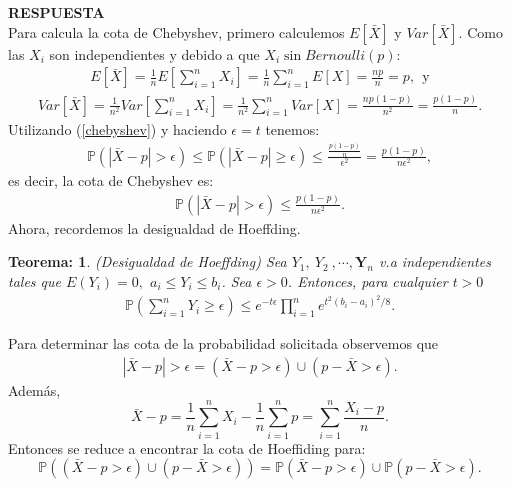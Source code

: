 \documentclass[11pt,letterpaper]{article}
\newcommand{\Y}{\mathbf{Y}}
\newcommand{\mP}{\mathbb{P}}
\newcommand{\res}{\textbf{RESPUESTA}\\}
\newtheorem{thm}{Teorema:}
\begin{document}
\res Para calcula la cota de Chebyshev, primero calculemos $E[\bar{X}]$ y $Var[\bar{X}]$. Como las $X_i$ son independientes y debido a que $X_i\sin Bernoulli(p)$:
\begin{align*}
E[\bar{X}]=\frac{1}{n}E[\sum_{i=1}^nX_i]=\frac{1}{n}\sum_{i=1}^nE[X]=\frac{np}{n}=p, \ \ \text{y}
\end{align*}
\begin{align*}
Var[\bar{X}]=\frac{1}{n^2}Var[\sum_{i=1}^nX_i]=\frac{1}{n^2}\sum_{i=1}^nVar[X]=\frac{np(1-p)}{n^2}=\frac{p(1-p)}{n}.
\end{align*}
Utilizando (\ref{chebyshev}) y haciendo $\epsilon=t$ tenemos:
\begin{align*}
\mP(|\bar{X}-p|>\epsilon) \leq \mP(|\bar{X}-p|\geq \epsilon) \leq \frac{\frac{p(1-p)}{n}}{\epsilon^2}=\frac{p(1-p)}{n\epsilon^2 },
\end{align*}
es decir, la cota de Chebyshev es:
\begin{align*}
\mP(|\bar{X}-p|>\epsilon) \leq \frac{p(1-p)}{n\epsilon^2 }.
\end{align*}
Ahora, recordemos la desigualdad de Hoeffding.
\begin{framed}
    \begin{thm} (Desigualdad de Hoeffding) Sea $Y_1, \ Y_2\ ,\cdots,\Y_n$ v.a independientes tales que $E(Y_i)=0,$ $a_i\leq Y_i \leq b_i$. Sea $\epsilon>0$. Entonces, para cualquier $t>0$
        \begin{align}
            \mP\left(\sum_{i=1}^nY_i\geq \epsilon \right) \leq e^{-t\epsilon}\prod_{i=1}^ne^{t^2(b_i-a_i)^2/8}.
        \end{align}
    \end{thm}
\end{framed} 
Para determinar las cota de la probabilidad solicitada observemos que
\begin{align}
\label{valor_absoluto}
|\bar{X}-p|>\epsilon=(\bar{X}-p>\epsilon)\cup(p-\bar{X}>\epsilon).
\end{align}
Además,
\begin{equation}
\label{igualdad}
\bar{X}-p=\frac{1}{n}\sum_{i=1}^n X_i-\frac{1}{n}\sum_{i=1}^n p=\sum_{i=1}^n\frac{X_i-p}{n}.
\end{equation}
Entonces se reduce a encontrar la cota de Hoeffiding para:
$$\mP\left( (\bar{X}-p>\epsilon)\cup(p-\bar{X}>\epsilon)\right)=\mP(\bar{X}-p>\epsilon)\cup\mP(p-\bar{X}>\epsilon).$$
\end{document}
